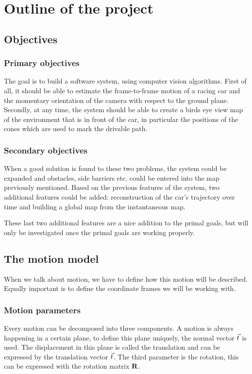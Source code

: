 \chapter{Outline of the project}
\label{chap:outline}

\section{Objectives}
\subsection{Primary objectives}
The goal is to build a software system, using computer vision algorithms. First of all, it should be able to estimate the frame-to-frame motion of a racing car and the momentary orientation of the camera with respect to the ground plane. Secondly, at any time, the system should be able to create a birds eye view map of the environment that is in front of the car, in particular the positions of the cones which are used to mark the drivable path.\bigskip 

\subsection{Secondary objectives}
When a good solution is found to these two problems, the system could be expanded and obstacles, side barriers etc. could be entered into the map previously mentioned. Based on the previous features of the system, two additional features could be added: reconstruction of the car's trajectory over time and building a global map from the instantaneous map.\bigskip

These last two additional features are a nice addition to the primal goals, but will only be investigated once the primal goals are working properly.\bigskip

\section{The motion model}
When we talk about motion, we have to define how this motion will be described. Equally important is to define the coordinate frames we will be working with.

\subsection{Motion parameters}
Every motion can be decomposed into three components. A motion is always happening in a certain plane, to define this plane uniquely, the normal vector $\vec t$ is used. The displacement in this plane is called the translation and can be expressed by the translation vector $\vec t$. The third parameter is the rotation, this can be expressed with the rotation matrix $\mathbf{R}$.\bigskip

